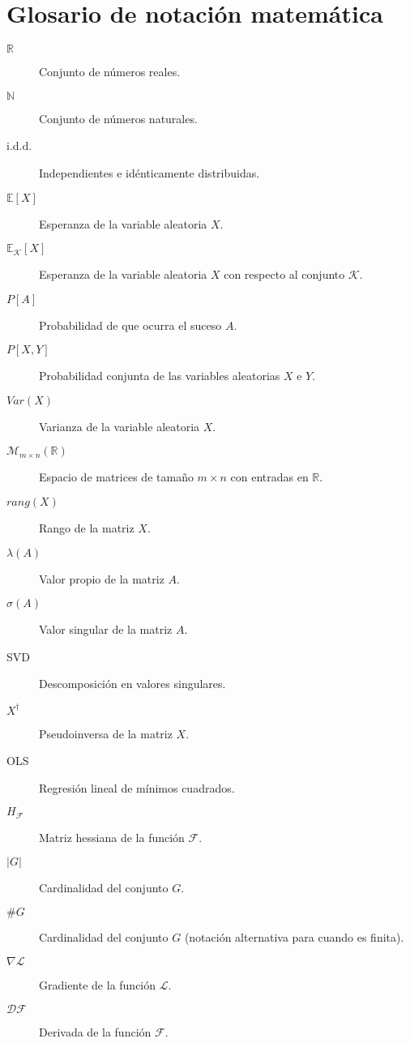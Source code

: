 
\chapter*{Glosario de notación matemática}

\begin{description} 
  \item[$\mathbb{R}$] Conjunto de números reales.
  \item[$\mathbb{N}$] Conjunto de números naturales.
  \item[i.d.d.] Independientes e idénticamente distribuidas.
  \item[${\mathbb{E}[X]}$] Esperanza de la variable aleatoria $X$.
  \item[${\mathbb{E}_{\mathcal{K}}[X]}$] Esperanza de la variable aleatoria $X$ con respecto al conjunto $\mathcal{K}$.
  \item[${P[A]}$] Probabilidad de que ocurra el suceso $A$.
  \item[${P[X, Y]}$] Probabilidad conjunta de las variables aleatorias $X$ e $Y$.
  \item[$Var(X)$] Varianza de la variable aleatoria $X$.
  \item[$\mathcal{M}_{m \times n}(\mathbb{R})$] Espacio de matrices de tamaño $m \times n$ con entradas en $\mathbb{R}$.
  \item[$rang(X)$] Rango de la matriz $X$. 
  \item[$\lambda(A)$] Valor propio de la matriz $A$.
  \item[$\sigma(A)$] Valor singular de la matriz $A$.
  \item[SVD] Descomposición en valores singulares.
  \item[$X^{\dagger}$] Pseudoinversa de la matriz $X$.
  \item[OLS] Regresión lineal de mínimos cuadrados.
  \item[$H_{\mathcal{F}}$] Matriz hessiana de la función $\mathcal{F}$.
  \item[$|G|$] Cardinalidad del conjunto $G$.
  \item[$\#G$] Cardinalidad del conjunto $G$ (notación alternativa para cuando es finita).
  \item[$\nabla\mathcal{L}$] Gradiente de la función $\mathcal{L}$.
  \item[$\mathcal{DF}$] Derivada de la función $\mathcal{F}$.

\end{description}
